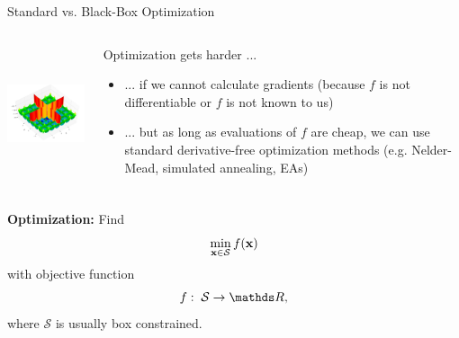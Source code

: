 \documentclass[11pt,compress,t,notes=noshow, xcolor=table]{beamer}
\begin{document}
\begin{vbframe}{Standard vs. Black-Box Optimization}
\begin{columns}
\begin{column}{0.4\textwidth}
\begin{center}
\includegraphics[height = 4cm]{figure_man/cross-in-tray.jpg}
\end{center}
\end{column}
\begin{column}{0.59\textwidth}
Optimization gets harder ...
\begin{itemize}
\item ... if we cannot calculate gradients (because $f$ is not differentiable or $f$ is not known to us)
\item ... but as long as evaluations of $f$ are cheap, we can use standard derivative-free optimization methods (e.g. Nelder-Mead, simulated annealing, EAs)
\end{itemize}
\end{column}
\end{columns}

\framebreak 

\textbf{Optimization: } Find
$$
\min_{\mathbf{x} \in \mathcal{S}} f(\mathbf{x})
$$
with objective function
$$
f: \; \mathcal{S} \to \R,
$$
where $\mathcal{S}$ is usually box constrained.

\lz 

\begin{columns}
\begin{column}{0.4\textwidth}

\vspace*{-0.8cm}




\end{column}
\end{columns}
\end{vbframe}
\end{document}
